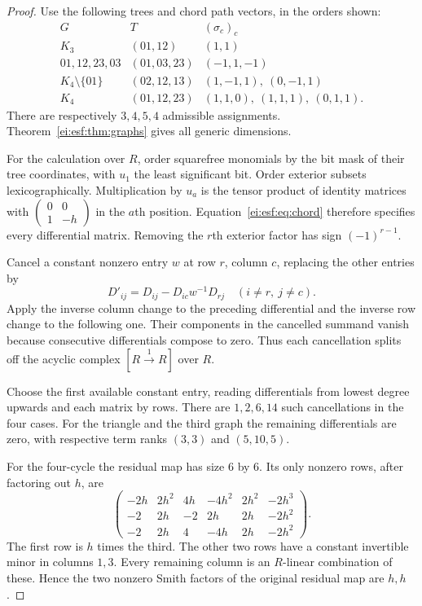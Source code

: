 \begin{proof}
Use the following trees and chord path vectors, in the
orders shown:
\[
\begin{array}{c|c|c}
 G&T& (\sigma_c)_c\\\hline
 K_3&(01,12)&(1,1)\\
 01,12,23,03&(01,03,23)&(-1,1,-1)\\
 K_4\setminus\{01\}&(02,12,13)&(1,-1,1),\ (0,-1,1)\\
 K_4&(01,12,23)&(1,1,0),\ (1,1,1),\ (0,1,1).
\end{array}
\]
There are respectively $3,4,5,4$ admissible assignments.
Theorem~\ref{ei:esf:thm:graphs} gives all generic dimensions.

For the calculation over $R$, order squarefree monomials
by the bit mask of their tree coordinates, with $u_1$
the least significant bit. Order exterior subsets
lexicographically. Multiplication by $u_a$ is the tensor
product of identity matrices with
$\left(\begin{smallmatrix}0&0\\1&-h\end{smallmatrix}\right)$
in the $a$th position. Equation~\eqref{ei:esf:eq:chord}
therefore specifies every differential matrix. Removing
the $r$th exterior factor has sign $(-1)^{r-1}$.

Cancel a constant nonzero entry $w$ at row $r$, column
$c$, replacing the other entries by
\[
 D'_{ij}=D_{ij}-D_{ic}w^{-1}D_{rj}
 \quad(i\ne r,\ j\ne c).
\]
Apply the inverse column change to the preceding
differential and the inverse row change to the following
one. Their components in the cancelled summand vanish
because consecutive differentials compose to zero.
Thus each cancellation splits off the acyclic complex
$[R\xrightarrow{1}R]$ over $R$.

Choose the first available constant entry, reading
differentials from lowest degree upwards and each matrix
by rows. There are $1,2,6,14$ such cancellations in the
four cases. For the triangle and the third graph the
remaining differentials are zero, with respective term
ranks $(3,3)$ and $(5,10,5)$.

For the four-cycle the residual map has size $6$ by $6$.
Its only nonzero rows, after factoring out $h$, are
\[
 \begin{pmatrix}
 -2h&2h^2&4h&-4h^2&2h^2&-2h^3\\
 -2&2h&-2&2h&2h&-2h^2\\
 -2&2h&4&-4h&2h&-2h^2
 \end{pmatrix}.
\]
The first row is $h$ times the third. The other two
rows have a constant invertible minor in columns $1,3$.
Every remaining column is an $R$-linear combination
of these. Hence the two nonzero Smith factors of the
original residual map are $h,h$.


\end{proof}
